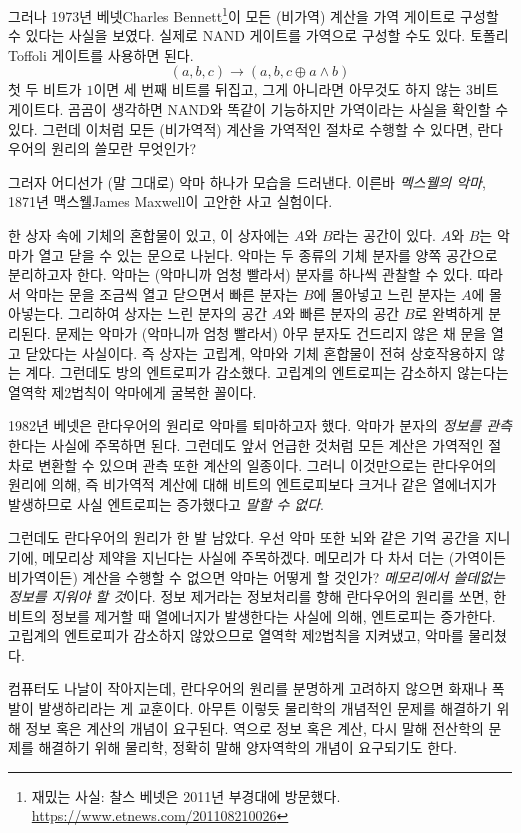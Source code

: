 \documentclass[a4paper,chapter,atbegshi]{oblivoir}
\begin{document}
그러나 1973년 베넷{\tiny Charles Bennett}\footnote{재밌는 사실: 찰스 베넷은 2011년
부경대에 방문했다. \url{https://www.etnews.com/201108210026}}이 
모든 (비가역) 계산을 가역 게이트로 구성할 수 있다는 사실을 보였다. 
실제로 NAND 게이트를 가역으로 구성할 수도 있다. 토폴리{\tiny Toffoli} 게이트를
사용하면 된다. 
\[
  (a,b,c)\rightarrow(a,b,c\oplus a \wedge b)
\]
첫 두 비트가 $1$이면 세 번째 비트를 뒤집고, 그게 아니라면 아무것도
하지 않는 $3$비트 게이트다. 곰곰이 생각하면 NAND와 똑같이 기능하지만 가역이라는
사실을 확인할 수 있다. 그런데 이처럼 모든 (비가역적) 계산을 가역적인 절차로
수행할 수 있다면, 란다우어의 원리의 쓸모란 무엇인가? 

그러자 어디선가 (말 그대로) 악마 하나가 모습을 드러낸다. 이른바 
\emph{멕스웰의 악마}, 1871년 맥스웰{\tiny James Maxwell}이 고안한 사고 실험이다. 

한 상자 속에 기체의 혼합물이 있고, 이 상자에는 $A$와 $B$라는 공간이 있다.
$A$와 $B$는 악마가 열고 닫을 수 있는 문으로 나뉜다. 악마는 두 종류의 기체 분자를
양쪽 공간으로 분리하고자 한다. 악마는 (악마니까 엄청 빨라서) 분자를 하나씩 관찰할
수 있다. 따라서 악마는 문을 조금씩 열고 닫으면서 빠른 분자는 $B$에 몰아넣고 느린
분자는 $A$에 몰아넣는다. 그리하여 상자는 느린 분자의 공간 $A$와 빠른 분자의 공간
$B$로 완벽하게 분리된다. 문제는 악마가 (악마니까 엄청 빨라서) 아무 분자도
건드리지 않은 채 문을 열고 닫았다는 사실이다. 즉 상자는 고립계, 악마와 기체
혼합물이 전혀 상호작용하지 않는 계다. 그런데도 방의 엔트로피가 감소했다.
고립계의 엔트로피는 감소하지 않는다는 열역학 제2법칙이 악마에게 굴복한 꼴이다. 

1982년 베넷은 란다우어의 원리로 악마를 퇴마하고자 했다. 악마가 분자의
\emph{정보를 관측}한다는 사실에 주목하면 된다. 그런데도 앞서 언급한 것처럼 모든
계산은 가역적인 절차로 변환할 수 있으며 관측 또한 계산의 일종이다. 그러니 
이것만으로는 란다우어의 원리에 의해, 즉 비가역적 계산에 대해 비트의 엔트로피보다
크거나 같은 열에너지가 발생하므로 사실 엔트로피는 증가했다고 \emph{말할 수 없다}.

그런데도 란다우어의 원리가 한 발 남았다. 우선 악마 또한 뇌와 같은 기억 공간을
지니기에, 메모리상 제약을 지닌다는 사실에 주목하겠다. 메모리가 다 차서
더는 (가역이든 비가역이든) 계산을 수행할 수 없으면 악마는 어떻게 할 것인가?
\emph{메모리에서 쓸데없는 정보를 지워야 할 것}이다. 정보 제거라는 정보처리를
향해 란다우어의 원리를 쏘면, 한 비트의 정보를 제거할 때 열에너지가 발생한다는
사실에 의해, 엔트로피는 증가한다. 고립계의 엔트로피가 감소하지 않았으므로
열역학 제2법칙을 지켜냈고, 악마를 물리쳤다. 

컴퓨터도 나날이 작아지는데, 란다우어의 원리를 분명하게 고려하지 않으면 화재나
폭발이 발생하리라는 게 교훈이다. 아무튼 이렇듯 물리학의 개념적인 문제를
해결하기 위해 정보 혹은 계산의 개념이 요구된다. 역으로 정보 혹은 계산, 다시 말해
전산학의 문제를 해결하기 위해 물리학, 정확히 말해 양자역학의 개념이 요구되기도
한다. 
\end{document}
